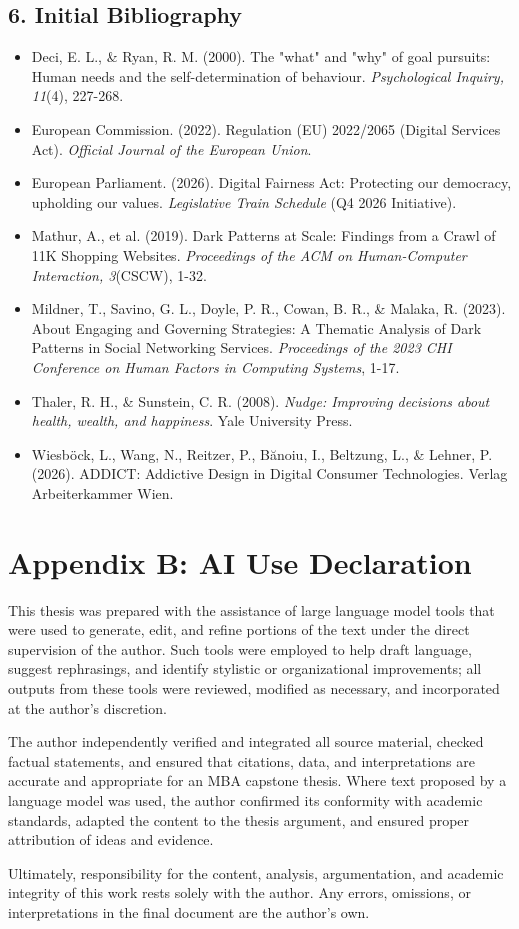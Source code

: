\documentclass[11pt]{article}
\begin{document}
\subsection*{6. Initial Bibliography}
\begin{itemize}
\item Deci, E. L., \& Ryan, R. M. (2000). The "what" and "why" of goal pursuits: Human needs and the self-determination of behaviour. \textit{Psychological Inquiry, 11}(4), 227-268.
\item European Commission. (2022). Regulation (EU) 2022/2065 (Digital Services Act). \textit{Official Journal of the European Union}.
\item European Parliament. (2026). Digital Fairness Act: Protecting our democracy, upholding our values. \textit{Legislative Train Schedule} (Q4 2026 Initiative).
\item Mathur, A., et al. (2019). Dark Patterns at Scale: Findings from a Crawl of 11K Shopping Websites. \textit{Proceedings of the ACM on Human-Computer Interaction, 3}(CSCW), 1-32.
\item Mildner, T., Savino, G. L., Doyle, P. R., Cowan, B. R., \& Malaka, R. (2023). About Engaging and Governing Strategies: A Thematic Analysis of Dark Patterns in Social Networking Services. \textit{Proceedings of the 2023 CHI Conference on Human Factors in Computing Systems}, 1-17.
\item Thaler, R. H., \& Sunstein, C. R. (2008). \textit{Nudge: Improving decisions about health, wealth, and happiness}. Yale University Press.
\item Wiesb\"ock, L., Wang, N., Reitzer, P., B\u{a}noiu, I., Beltzung, L., \& Lehner, P. (2026). ADDICT: Addictive Design in Digital Consumer Technologies. Verlag Arbeiterkammer Wien.
\end{itemize}

\newpage
\section{Appendix B: AI Use Declaration}
\label{sec:appendix_b_ai_declaration}
This thesis was prepared with the assistance of large language model tools that were used to generate, edit, and refine portions of the text under the direct supervision of the author. Such tools were employed to help draft language, suggest rephrasings, and identify stylistic or organizational improvements; all outputs from these tools were reviewed, modified as necessary, and incorporated at the author's discretion.

The author independently verified and integrated all source material, checked factual statements, and ensured that citations, data, and interpretations are accurate and appropriate for an MBA capstone thesis. Where text proposed by a language model was used, the author confirmed its conformity with academic standards, adapted the content to the thesis argument, and ensured proper attribution of ideas and evidence.

Ultimately, responsibility for the content, analysis, argumentation, and academic integrity of this work rests solely with the author. Any errors, omissions, or interpretations in the final document are the author's own.
\end{document}
